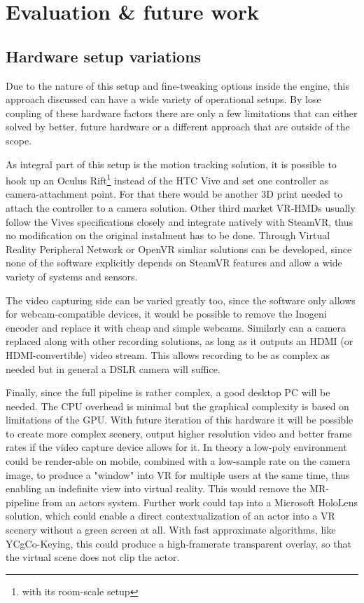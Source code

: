 %
\chapter{Evaluation \& future work}

\section{Hardware setup variations}

Due to the nature of this setup and fine-tweaking options inside the engine, 
this approach discussed can have a wide variety of operational setups. By lose 
coupling of these hardware factors there are only a few limitations that can 
either solved by better, future hardware or a different approach that are 
outside of the scope.

As integral part of this setup is the motion tracking solution, it is possible 
to hook up an Oculus Rift\footnote{with its room-scale setup} instead of the 
HTC Vive and set one controller as camera-attachment point. For that there 
would be another 3D print needed to attach the controller to a camera solution. 
\newline
Other third market VR-HMDs usually follow the Vives specifications closely and 
integrate natively with SteamVR, thus no modification on the original 
instalment has to be done.
\newline
Through Virtual Reality Peripheral Network or OpenVR simliar solutions can be 
developed, since none of the software explicitly depends on SteamVR features 
and allow a wide variety of systems and sensors.

The video capturing side can be varied greatly too, since the software only 
allows for webcam-compatible devices, it would be possible to remove 
the Inogeni encoder and replace it with cheap and simple webcams. Similarly can 
a camera replaced along with other recording solutions, as long as it outputs 
an HDMI (or HDMI-convertible) video stream. This allows recording to be as 
complex as needed but in general a DSLR camera will suffice.

Finally, since the full pipeline is rather complex, a good desktop PC will be 
needed. The CPU overhead is minimal but the graphical complexity is based on 
limitations of the GPU. With future iteration of this hardware it will be 
possible to create more complex scenery, output higher resolution video and 
better frame rates if the video capture device allows for it.
\newline
In theory a low-poly environment could be render-able on mobile, combined with 
a low-sample rate on the camera image, to produce a "window" into VR for 
multiple users at the same time, thus enabling an indefinite view into virtual 
reality. This would remove the MR-pipeline from an actors system. Further work 
could tap into a Microsoft HoloLens solution, which could enable a direct 
contextualization of an actor into a VR scenery without a green screen at all. 
With fast approximate algorithms, like YCgCo-Keying, this could produce a 
high-framerate transparent overlay, so that the virtual scene does not clip the 
actor.

